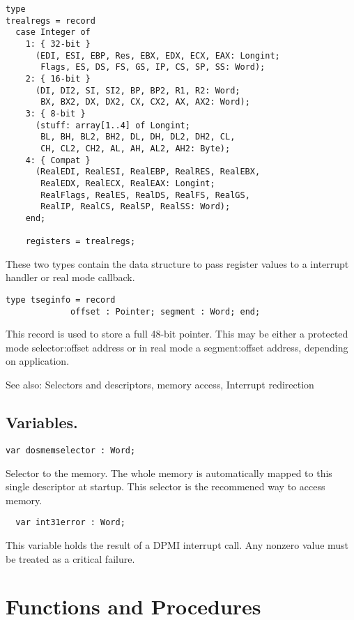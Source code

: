 \begin{verbatim}
type 
trealregs = record
  case Integer of 
    1: { 32-bit } 
      (EDI, ESI, EBP, Res, EBX, EDX, ECX, EAX: Longint; 
       Flags, ES, DS, FS, GS, IP, CS, SP, SS: Word); 
    2: { 16-bit } 
      (DI, DI2, SI, SI2, BP, BP2, R1, R2: Word;
       BX, BX2, DX, DX2, CX, CX2, AX, AX2: Word);
    3: { 8-bit } 
      (stuff: array[1..4] of Longint;
       BL, BH, BL2, BH2, DL, DH, DL2, DH2, CL,
       CH, CL2, CH2, AL, AH, AL2, AH2: Byte);
    4: { Compat } 
      (RealEDI, RealESI, RealEBP, RealRES, RealEBX, 
       RealEDX, RealECX, RealEAX: Longint; 
       RealFlags, RealES, RealDS, RealFS, RealGS, 
       RealIP, RealCS, RealSP, RealSS: Word);
    end;

    registers = trealregs;
\end{verbatim}
These two types contain the data structure to pass register values to a
interrupt handler or real mode callback.

\begin{verbatim}
type tseginfo = record
             offset : Pointer; segment : Word; end;
\end{verbatim}

This record is used to store a full 48-bit pointer. This may be either a
protected mode selector:offset address or in real mode a segment:offset
address, depending on application.

See also: Selectors and descriptors, \dos memory access, Interrupt
redirection

\subsection{Variables.}

\begin{verbatim}
var dosmemselector : Word;
\end{verbatim}

Selector to the \dos memory. The whole \dos memory is automatically mapped to
this single descriptor at startup. This selector is the recommened way to
access \dos memory.

\begin{verbatim}
  var int31error : Word;
\end{verbatim}

This variable holds the result of a DPMI interrupt call. Any nonzero value
must be treated as a critical failure.

\section{Functions and Procedures}

